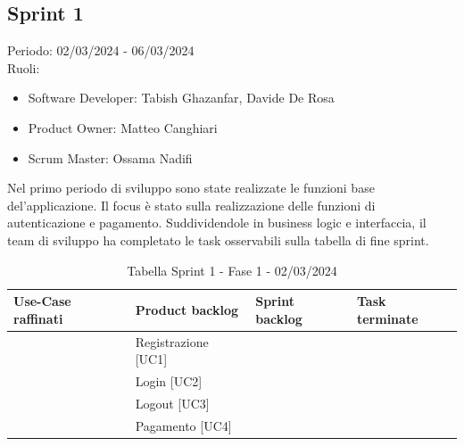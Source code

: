 \documentclass{article}
\begin{document}
\subsection{Sprint 1}
Periodo: 02/03/2024 - 06/03/2024\vspace*{7pt}\\
Ruoli:
\begin{itemize}[label = { }]
    \itemsep0em
    \item Software Developer: Tabish Ghazanfar, Davide De Rosa
    \item Product Owner: Matteo Canghiari
    \item Scrum Master: Ossama Nadifi
\end{itemize}
Nel primo periodo di sviluppo sono state realizzate le funzioni base del'applicazione. Il focus è stato sulla realizzazione delle funzioni di autenticazione e pagamento. Suddividendole in business logic e interfaccia, il team di sviluppo ha completato le task osservabili sulla tabella di fine sprint.\vspace*{7pt}\\

\begin{table}[h]
    \centering
    \begin{tabularx}{\textwidth}{|X|X|X|X|}
        \hline
        \bf Use-Case raffinati & \bf Product backlog & \bf Sprint backlog & \bf Task terminate \\
        \hline
        & Registrazione [UC1] & & \\
        \hline
        & Login [UC2] & & \\
        \hline
        & Logout [UC3] & & \\
        \hline
        & Pagamento [UC4] &  &  \\
        \hline
    \end{tabularx}
    \caption*{Tabella Sprint 1 - Fase 1 - 02/03/2024}
\end{table}
\end{document}
